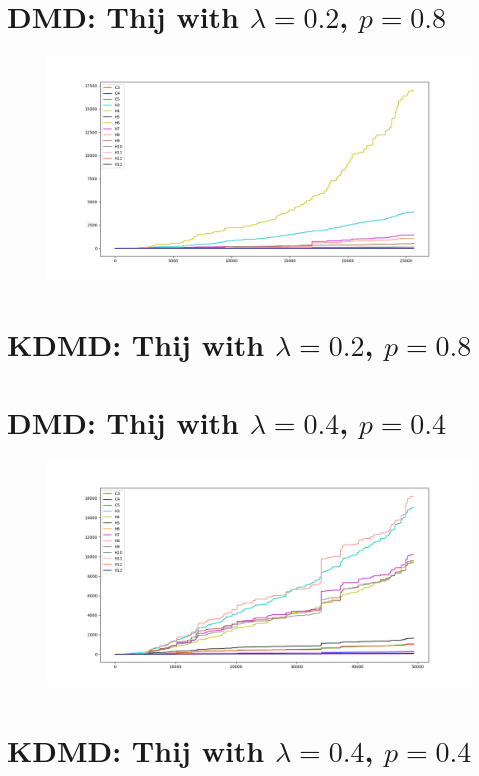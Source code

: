 \FloatBarrier

\section{DMD: Thij with $\lambda=0.2$, $p=0.8$}
\begin{figure}
    \includegraphics[width=12cm]{Images/twitter_counts_020809.png}
    \centering
\end{figure}

\section{KDMD: Thij with $\lambda=0.2$, $p=0.8$}


\FloatBarrier

\section{DMD: Thij with $\lambda=0.4$, $p=0.4$}

\begin{figure}
    \includegraphics[width=12cm]{Images/twitter_counts_040409.png}
    \centering
\end{figure}

\section{KDMD: Thij with $\lambda=0.4$, $p=0.4$}


